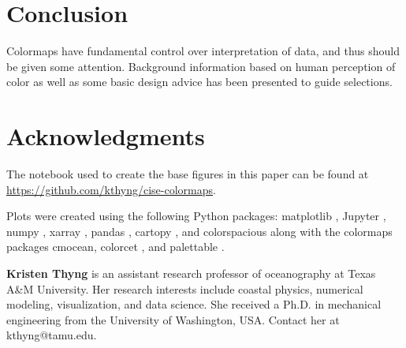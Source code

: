\documentclass[10pt,journal,compsoc]{IEEEtran}
\begin{document}
\section{Conclusion}

Colormaps have fundamental control over interpretation of data, and thus should be given some attention. Background information based on human perception of color as well as some basic design advice has been presented to guide selections.


\section{Acknowledgments}

The notebook used to create the base figures in this paper can be found at \url{https://github.com/kthyng/cise-colormaps}.

Plots were created using the following Python packages: matplotlib \citep{hunter2007matplotlib}, Jupyter \citep{kluyver2016jupyter}, numpy \citep{oliphant2006guide,walt2011numpy},
xarray \citep{hoyer2017xarray},
pandas \citep{mckinney-proc-scipy-2010}, cartopy \citep{Cartopy}, and colorspacious \citep{colorspacious} along with the colormaps packages cmocean, colorcet \citep{colorcet}, and palettable \citep{palettable}.






\bigskip

\textbf{Kristen Thyng} is an assistant research professor of oceanography at Texas A\&M University. Her research interests include coastal physics, numerical modeling, visualization, and data science. She received a Ph.D. in mechanical engineering from the University of Washington, USA. Contact her at kthyng@tamu.edu.
\end{document}
